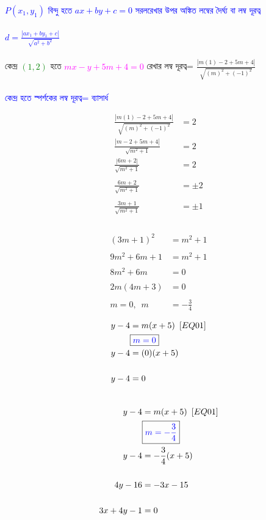 \documentclass{article}
\begin{document}
	\textcolor{blue}{$P(x_1,y_1)$ বিন্দু হতে  $ax+by+c=0$ সরলরেখার উপর অঙ্কিত লম্বের দৈর্ঘ্য বা লম্ব দূরত্ব \\
		\\
		$d=\frac{|ax_1+by_1+c|}{\sqrt{a^2+b^2}}$}\\
	\\
	কেন্দ্র \textcolor{green}{$(1,2)$} হতে \textcolor{magenta}{$mx-y+5m+4=0$}  রেখার লম্ব দূরত্ব= $	\frac{|m(1)-2+5m+4|}{\sqrt{(m)^2+(-1)^2}}$\\
	\\ 
	\textcolor{blue}{কেন্দ্র হতে স্পর্শকের লম্ব দূরত্ব= ব্যাসার্ধ}\\ 
	\begin{multicols}{2}
\begin{align*}
	\frac{|m(1)-2+5m+4|}{\sqrt{(m)^2+(-1)^2}}&=2\\
	\frac{|m-2+5m+4|}{\sqrt{m^2+1}}&=2\\
	\frac{|6m+2|}{\sqrt{m^2+1}}&=2\\
	\\
	\frac{6m+2}{\sqrt{m^2+1}}&=\pm 2\\
	\\
	\frac{3m+1}{\sqrt{m^2+1}}&=\pm 1\\
\end{align*}
\\
\begin{align*}
	(3m+1)^2&=m^2+1\\
	\\
	9m^2+6m+1&=m^2+1\\
	\\
	8m^2+6m&=0\\
	\\
	2m(4m+3)&=0\\
	\\
	m=0,\,\,\,m&=-\frac{3}{4}
\end{align*}
	\end{multicols}
\begin{multicols}{2}
	\begin{align*}
	y-4&=m(x+5)\,\,\,[EQ01]\\
	&	\boxed{\textcolor{blue}{m=0}}\\
	y-4&=(0)(x+5)\\
	\\
	y-4&=0
\end{align*}
\\
\begin{align*}
	y-4&=m(x+5)\,\,\,[EQ01]\\
	&	\boxed{\textcolor{blue}{m=-\frac{3}{4}}}\\
	y-4&=-\frac{3}{4}(x+5)\\
	\\
	4y-16&=-3x-15\\
	\\
	3x+4y-1&=0
\end{align*}
\end{multicols}
\end{document}
